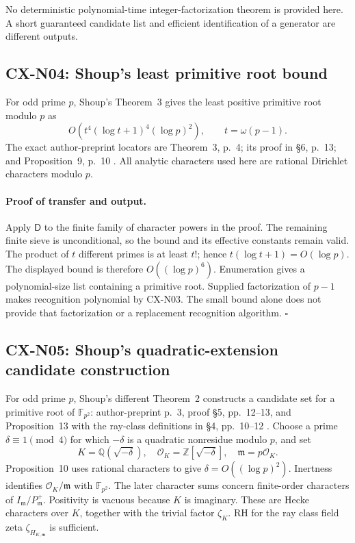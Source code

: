 \documentclass[11pt,a4paper]{article}
\begin{document}
No deterministic polynomial-time integer-factorization theorem is
provided here. A short guaranteed candidate list and efficient
identification of a generator are different outputs.

\subsection{CX-N04: Shoup's least primitive root bound}
\label{cx-n04}

For odd prime \(p\), Shoup's Theorem~3 gives the least positive primitive root modulo \(p\) as
\[
 O\!\left(t^4(\log t+1)^4(\log p)^2\right),\qquad t=\omega(p-1).
\]
The exact author-preprint locators are Theorem~3, p.~4; its proof in
\S6, p.~13; and Proposition~9, p.~10 \cite{CXNShoup92}.
All analytic characters used here are rational Dirichlet characters
modulo \(p\).

\paragraph{Proof of transfer and output.}
Apply \(\mathsf D\) to the finite family of character powers in the proof.
The remaining finite sieve is unconditional, so the bound and its
effective constants remain valid. The product of \(t\) different primes
is at least \(t!\); hence \(t(\log t+1)=O(\log p)\). The displayed bound is
therefore \(O((\log p)^6)\). Enumeration gives a polynomial-size list
containing a primitive root. Supplied factorization of \(p-1\) makes
recognition polynomial by CX-N03. The small bound alone does not provide
that factorization or a replacement recognition algorithm. \(\square\)

\subsection{CX-N05: Shoup's quadratic-extension candidate construction}
\label{cx-n05}

For odd prime \(p\), Shoup's different Theorem~2 constructs a candidate set for a primitive
root of \(\mathbb F_{p^2}\): author-preprint p.~3, proof \S5, pp.~12--13,
and Proposition~13 with the ray-class definitions in \S4, pp.~10--12
\cite{CXNShoup92}. Choose a prime \(\delta\equiv1\pmod4\) for which
\(-\delta\) is a quadratic nonresidue modulo \(p\), and set
\[
 K=\mathbb Q(\sqrt{-\delta}),\quad
 \mathcal O_K=\mathbb Z[\sqrt{-\delta}],\quad
 \mathfrak m=p\mathcal O_K .
\]
Proposition~10 uses rational characters to give
\(\delta=O((\log p)^2)\). Inertness identifies
\(\mathcal O_K/\mathfrak m\) with \(\mathbb F_{p^2}\).
The later character sums concern finite-order characters of
\(I_{\mathfrak m}/P_{\mathfrak m}^{+}\). Positivity is vacuous because
\(K\) is imaginary. These are Hecke characters over \(K\), together with
the trivial factor \(\zeta_K\). RH for the ray class field zeta
\(\zeta_{H_{K,\mathfrak m}}\) is sufficient.
\end{document}
